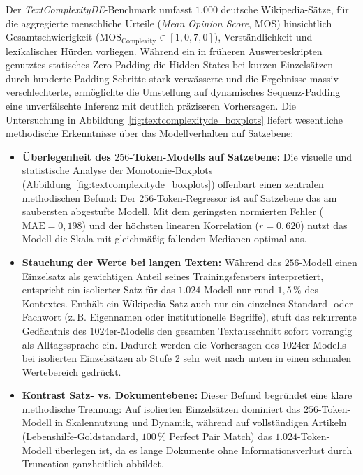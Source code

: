 Der \textit{TextComplexityDE}-Benchmark \citep{naderi2019textcomplexityde} umfasst $1.000$ deutsche Wikipedia-Sätze, für die aggregierte menschliche Urteile (\textit{Mean Opinion Score}, MOS) hinsichtlich Gesamtschwierigkeit ($\text{MOS}_{\text{Complexity}} \in [1{,}0, 7{,}0]$), Verständlichkeit und lexikalischer Hürden vorliegen. Während ein in früheren Auswerteskripten genutztes statisches Zero-Padding die Hidden-States bei kurzen Einzelsätzen durch hunderte Padding-Schritte stark verwässerte und die Ergebnisse massiv verschlechterte, ermöglichte die Umstellung auf dynamisches Sequenz-Padding eine unverfälschte Inferenz mit deutlich präziseren Vorhersagen. Die Untersuchung in Abbildung~\ref{fig:textcomplexityde_boxplots} liefert wesentliche methodische Erkenntnisse über das Modellverhalten auf Satzebene:
\begin{itemize}
    \item \textbf{Überlegenheit des $256$-Token-Modells auf Satzebene:} Die visuelle und statistische Analyse der Monotonie-Boxplots (Abbildung~\ref{fig:textcomplexityde_boxplots}) offenbart einen zentralen methodischen Befund: Der $256$-Token-Regressor ist auf Satzebene das am saubersten abgestufte Modell. Mit dem geringsten normierten Fehler ($\text{MAE} = 0{,}198$) und der höchsten linearen Korrelation ($r = 0{,}620$) nutzt das Modell die Skala mit gleichmäßig fallenden Medianen optimal aus.
    \item \textbf{Stauchung der Werte bei langen Texten:} Während das $256$-Modell einen Einzelsatz als gewichtigen Anteil seines Trainingsfensters interpretiert, entspricht ein isolierter Satz für das $1.024$-Modell nur rund $1{,}5\,\%$ des Kontextes. Enthält ein Wikipedia-Satz auch nur ein einzelnes Standard- oder Fachwort (z.\,B. Eigennamen oder institutionelle Begriffe), stuft das rekurrente Gedächtnis des $1024$er-Modells den gesamten Textausschnitt sofort vorrangig als Alltagssprache ein. Dadurch werden die Vorhersagen des $1024$er-Modells bei isolierten Einzelsätzen ab Stufe 2 sehr weit nach unten in einen schmalen Wertebereich gedrückt.
    \item \textbf{Kontrast Satz- vs. Dokumentebene:} Dieser Befund begründet eine klare methodische Trennung: Auf isolierten Einzelsätzen dominiert das $256$-Token-Modell in Skalennutzung und Dynamik, während auf vollständigen Artikeln (Lebenshilfe-Goldstandard, $100\,\%$ Perfect Pair Match) das $1.024$-Token-Modell überlegen ist, da es lange Dokumente ohne Informationsverlust durch Truncation ganzheitlich abbildet.
\end{itemize}

